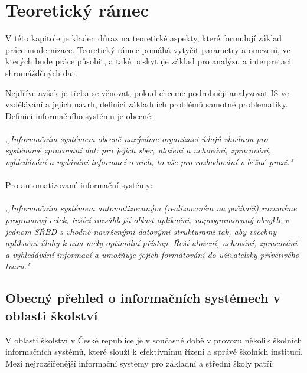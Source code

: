 \documentclass[FM,Proj]{tulthesis}
\begin{document}
\chapter{Teoretický rámec}
V této kapitole je kladen důraz na teoretické aspekty, které formulují základ práce 
modernizace. Teoretický rámec pomáhá vytyčit parametry a omezení, ve kterých bude 
práce působit, a také poskytuje základ pro analýzu a interpretaci shromážděných dat. 

Nejdříve avšak je třeba se věnovat, pokud chceme podrobněji analyzovat IS ve vzdělávání 
a jejich návrh, definici základních problémů samotné problematiky. Definicí 
informačního systému je obecně:
\\\\
\textit{,,Informačním systémem obecně nazýváme organizaci údajů vhodnou pro systémové 
zpracování dat: pro jejich sběr, uložení a uchování, zpracování, vyhledávání a vydávání 
informací o nich, to vše pro rozhodování v běžné praxi."}\cite{Sarmanova2008ISaDS}
\\\\
Pro automatizované informační systémy:
\\\\
\textit{,,Informačním systémem automatizovaným (realizovaném na počítači) rozumíme programový 
celek, řešící rozsáhlejší oblast aplikační, naprogramovaný obvykle v jednom SŘBD s 
vhodně navrženými datovými strukturami tak, aby všechny aplikační úlohy k nim měly optimální 
přístup. Řeší uložení, uchování, zpracování a vyhledávání informací a umožňuje jejich 
formátování do uživatelsky přívětivého tvaru."}\cite{Sarmanova2008ISaDS}

\section{Obecný přehled o informačních systémech v oblasti školství}
V oblasti školství v České republice je v současné době v provozu několik školních 
informačních systémů, které slouží k efektivnímu řízení a správě školních institucí. 
Mezi nejrozšířenější informační systémy pro základní a střední školy patří:
\end{document}
